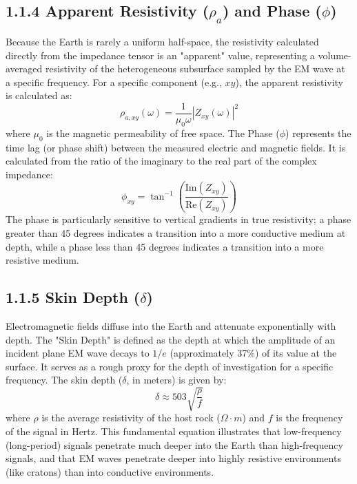 \subsection{1.1.4 Apparent Resistivity ($\rho_a$) and Phase ($\phi$)}
Because the Earth is rarely a uniform half-space, the resistivity calculated directly from the impedance tensor is an "apparent" value, representing a volume-averaged resistivity of the heterogeneous subsurface sampled by the EM wave at a specific frequency. For a specific component (e.g., $xy$), the apparent resistivity is calculated as:
\begin{equation}
\rho_{a,xy}(\omega) = \frac{1}{\mu_0 \omega} |Z_{xy}(\omega)|^2
\end{equation}
where $\mu_0$ is the magnetic permeability of free space. The Phase ($\phi$) represents the time lag (or phase shift) between the measured electric and magnetic fields. It is calculated from the ratio of the imaginary to the real part of the complex impedance:
\begin{equation}
\phi_{xy} = \tan^{-1} \left( \frac{\text{Im}(Z_{xy})}{\text{Re}(Z_{xy})} \right)
\end{equation}
The phase is particularly sensitive to vertical gradients in true resistivity; a phase greater than 45 degrees indicates a transition into a more conductive medium at depth, while a phase less than 45 degrees indicates a transition into a more resistive medium.

\subsection{1.1.5 Skin Depth ($\delta$)}
Electromagnetic fields diffuse into the Earth and attenuate exponentially with depth. The "Skin Depth" is defined as the depth at which the amplitude of an incident plane EM wave decays to $1/e$ (approximately 37\%) of its value at the surface. It serves as a rough proxy for the depth of investigation for a specific frequency. The skin depth ($\delta$, in meters) is given by:
\begin{equation}
\delta \approx 503 \sqrt{\frac{\rho}{f}}
\end{equation}
where $\rho$ is the average resistivity of the host rock ($\Omega \cdot m$) and $f$ is the frequency of the signal in Hertz. This fundamental equation illustrates that low-frequency (long-period) signals penetrate much deeper into the Earth than high-frequency signals, and that EM waves penetrate deeper into highly resistive environments (like cratons) than into conductive environments.

